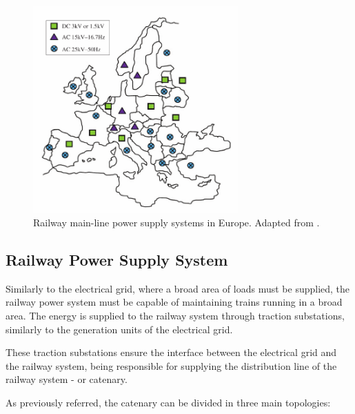 \begin{figure}[h!]
	\centering
	\includegraphics[width=0.7\textwidth,keepaspectratio]{figures/31.PowerS/abad2016}
	\caption{Railway main-line power supply systems in Europe. Adapted from \cite{abad2016}.}
	\label{fig:abad2016}
\end{figure}



\subsection{Railway Power Supply System}
\label{subs:312}

Similarly to the electrical grid, where a broad area of loads must be supplied, the railway power system must be capable of maintaining trains running in a broad area. The energy is supplied to the railway system through traction substations, similarly to the generation units of the electrical grid.

These traction substations ensure the interface between the electrical grid and the railway system, being responsible for supplying the distribution line of the railway system - or catenary.

As previously referred, the catenary can be divided in three main topologies:

%	
%	
%	
%

